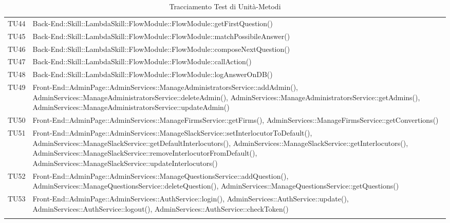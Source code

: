 \documentclass[../PianoDiQualifica_v3.0.0.tex]{subfiles}
\begin{document}
\begin{longtable}[c] { >{\centering\arraybackslash}p{} >{\centering\arraybackslash}p{}}
			\midrule
			\addlinespace[0.3em]
			TU44 & Back-End::Skill::LambdaSkill::FlowModule::FlowModule::getFirstQuestion() \\
			\addlinespace[0.3em]
			\midrule
			\addlinespace[0.3em]
			TU45 & Back-End::Skill::LambdaSkill::FlowModule::FlowModule::matchPossibileAnswer() \\
			\addlinespace[0.3em]
			\midrule
			\addlinespace[0.3em]
			TU46 & Back-End::Skill::LambdaSkill::FlowModule::FlowModule::composeNextQuestion() \\
			\addlinespace[0.3em]
			\midrule
			\addlinespace[0.3em]
			TU47 & Back-End::Skill::LambdaSkill::FlowModule::FlowModule::callAction() \\
			\addlinespace[0.3em]
			\midrule
			\addlinespace[0.3em]
			TU48 & Back-End::Skill::LambdaSkill::FlowModule::FlowModule::logAnswerOnDB() \\
			\addlinespace[0.3em]
			\midrule
			\addlinespace[0.3em]
			TU49 & Front-End::AdminPage::AdminServices::ManageAdministratorsService::addAdmin(), AdminServices::ManageAdministratorsService::deleteAdmin(), AdminServices::ManageAdministratorsService::getAdmins(), AdminServices::ManageAdministratorsService::updateAdmin() \\
			\addlinespace[0.3em]
			\midrule
			\addlinespace[0.3em]
			TU50 & Front-End::AdminPage::AdminServices::ManageFirmsService::getFirms(), AdminServices::ManageFirmsService::getConvertions() \\
			\addlinespace[0.3em]
			\midrule
			\addlinespace[0.3em]
			TU51 & Front-End::AdminPage::AdminServices::ManageSlackService::setInterlocutorToDefault(), AdminServices::ManageSlackService::getDefaultInterlocutors(), AdminServices::ManageSlackService::getInterlocutors(), AdminServices::ManageSlackService::removeInterlocutorFromDefault(), AdminServices::ManageSlackService::updateInterlocutors() \\
			\addlinespace[0.3em]
			\midrule
			\addlinespace[0.3em]
			TU52 & Front-End::AdminPage::AdminServices::ManageQuestionsService::addQuestion(), AdminServices::ManageQuestionsService::deleteQuestion(), AdminServices::ManageQuestionsService::getQuestions() \\
			\addlinespace[0.3em]
			\midrule
			\addlinespace[0.3em]
			TU53 & Front-End::AdminPage::AdminServices::AuthService::login(), AdminServices::AuthService::update(), AdminServices::AuthService::logout(), AdminServices::AuthService::checkToken() \\
			\bottomrule
			\caption{Tracciamento Test di Unità-Metodi}
	\end{longtable}
\end{document}
